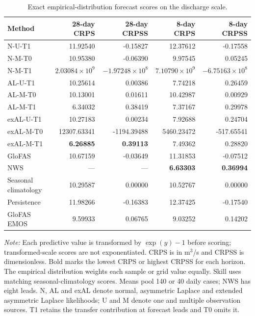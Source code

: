 \begin{table}[!htbp]
\centering
\begin{threeparttable}
\caption{Exact empirical-distribution forecast scores on the discharge scale.}
\label{tab:discharge_scale_scores}
\setlength{\tabcolsep}{4pt}
\begin{tabular}{lrrrr}
\hline
Method & 28-day CRPS & 28-day CRPSS & 8-day CRPS & 8-day CRPSS \\
\hline
N-U-T1 & 11.92540 & -0.15827 & 12.37612 & -0.17558 \\
N-M-T0 & 10.95380 & -0.06390 & 9.97545 & 0.05245 \\
N-M-T1 & $2.03084\times 10^{9}$ & $-1.97248\times 10^{8}$ & $7.10790\times 10^{9}$ & $-6.75163\times 10^{8}$ \\
AL-U-T1 & 10.25614 & 0.00386 & 7.74218 & 0.26459 \\
AL-M-T0 & 10.13001 & 0.01611 & 10.42987 & 0.00929 \\
AL-M-T1 & 6.34032 & 0.38419 & 7.37167 & 0.29978 \\
exAL-U-T1 & 10.27183 & 0.00234 & 7.92688 & 0.24704 \\
exAL-M-T0 & 12307.63341 & -1194.39488 & 5460.23472 & -517.65541 \\
exAL-M-T1 & \textbf{6.26885} & \textbf{0.39113} & 7.49362 & 0.28820 \\
GloFAS & 10.67159 & -0.03649 & 11.31853 & -0.07512 \\
NWS & --- & --- & \textbf{6.63303} & \textbf{0.36994} \\
Seasonal climatology & 10.29587 & 0.00000 & 10.52767 & 0.00000 \\
Persistence & 11.98266 & -0.16383 & 12.37425 & -0.17540 \\
GloFAS EMOS & 9.59933 & 0.06765 & 9.03252 & 0.14202 \\
\hline
\end{tabular}
\begin{tablenotes}\footnotesize
\item \textit{Note:} Each predictive value is transformed by $\exp(y)-1$ before scoring; transformed-scale scores are not exponentiated. CRPS is in m$^3$/s and CRPSS is dimensionless. Bold marks the lowest CRPS or highest CRPSS for each horizon. The empirical distribution weights each sample or grid value equally. Skill uses matching seasonal-climatology scores. Means pool 140 or 40 daily cases; NWS has eight leads. N, AL and exAL denote normal, asymmetric Laplace and extended asymmetric Laplace likelihoods; U and M denote one and multiple observation sources. T1 retains the transfer contribution at forecast leads and T0 omits it.
\end{tablenotes}
\end{threeparttable}
\end{table}
